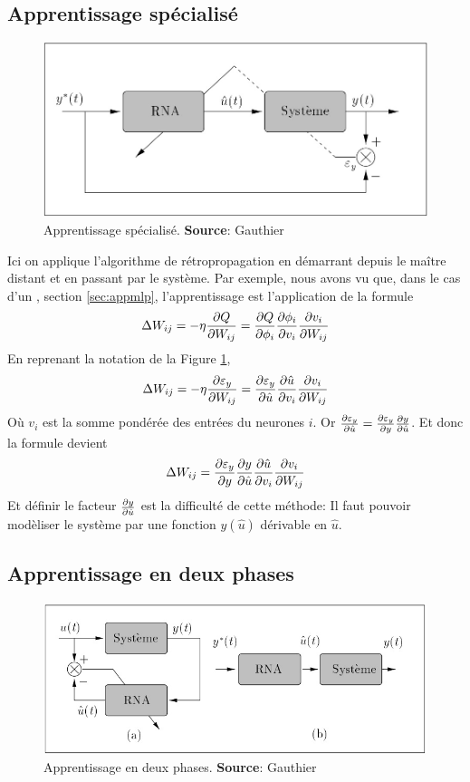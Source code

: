 \subsection{Apprentissage spécialisé}\label{sec:appspecial}
\begin{figure}
 \centering
 \includegraphics[scale=0.4]{../figures/appspecialise.jpg}
 \caption{Apprentissage spécialisé. \textbf{Source}: Gauthier\cite{Gauthier}}
 \label{appspecialise}
\end{figure}
Ici on applique l'algorithme de rétropropagation en démarrant depuis le maître distant et en passant par le système.
Par exemple, nous avons vu que, dans le cas d'un \mlp, section \ref{sec:appmlp}, l'apprentissage est l'application de la formule \[\Delta W_{ij} = -\eta\frac{\partial Q}{\partial W_{ij}} = \frac{\partial Q}{\partial \phi_i} \frac{\partial \phi_i}{\partial v_i} \frac{\partial v_i}{\partial W_{ij}}\]
En reprenant la notation de la Figure \ref{appspecialise}, \[\Delta W_{ij} = -\eta\frac{\partial \varepsilon_y}{\partial W_{ij}} = \frac{\partial \varepsilon_y}{\partial \hat{u}} \frac{\partial \hat{u}}{\partial v_i} \frac{\partial v_i}{\partial W_{ij}}\]
Où $v_i$ est la somme pondérée des entrées du neurones $i$.
Or $\frac{\partial \varepsilon_y}{\partial \hat{u}} = \frac{\partial \varepsilon_y}{\partial y}\frac{\partial y}{\partial \hat{u}}$. Et donc la formule devient
\[\Delta W_{ij} = \frac{\partial \varepsilon_y}{\partial y} \frac{\partial y}{\partial \hat{u}} \frac{\partial \hat{u}}{\partial v_i} \frac{\partial v_i}{\partial W_{ij}}\]
Et définir le facteur $\frac{\partial y}{\partial \hat{u}}$ est la difficulté de cette méthode:
Il faut pouvoir modèliser le système par une fonction $y(\hat{u})$ dérivable en $\hat{u}$.

\subsection{Apprentissage en deux phases}\label{sec:app2phases}
\begin{figure}
 \centering
 \includegraphics[scale=0.5]{../figures/app2phases.jpg}
 \caption{Apprentissage en deux phases. \textbf{Source}: Gauthier\cite{Gauthier}}
 \label{app2phases}
\end{figure}


